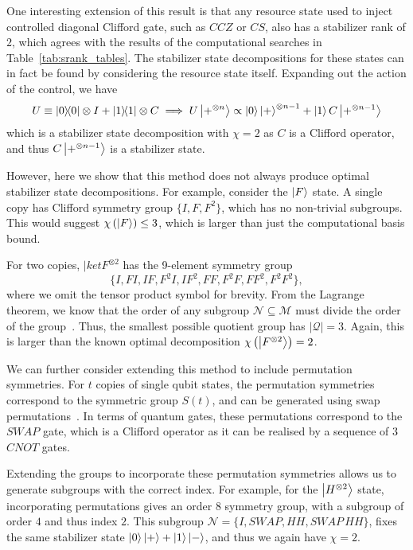One interesting extension of this result is that any resource state used to inject controlled diagonal Clifford gate, such as $CCZ$ or $CS$, also has a stabilizer rank of $2$, which agrees with the results of the computational searches in Table~\ref{tab:srank_tables}. The stabilizer state decompositions for these states can in fact be found by considering the resource state itself. Expanding out the action of the control, we have
\begin{equation}
U\equiv \ketbra{0}\otimes I+\ketbra{1}\otimes C \implies U\ket{+^{\otimes n}}\propto \ket{0}\ket{+}^{\otimes n-1}+\ket{1}C\ket{+^{\otimes n-1}}
\end{equation}
which is a stabilizer state decomposition with $\chi=2$ as $C$ is a Clifford operator, and thus $C\ket{+^{\otimes n-1}}$ is a stabilizer state.\par
However, here we show that this method does not always produce optimal stabilizer state decompositions. For example, consider the $\ket{F}$ state. A single copy has Clifford symmetry group $\{I, F, F^{2}\}$, which has no non-trivial subgroups. This would suggest $\chi\left(\ket{F}\right)\leq 3$, which is larger than just the computational basis bound.\par
For two copies, $|ket{F^{\otimes 2}}$ has the 9-element symmetry group
\begin{equation}
\{I,FI, IF, F^{2}I, IF^{2}, FF, F^{2}F, FF^{2}, F^{2}F^{2}\},
\label{eq:f2_symmetry_group}
\end{equation} where we omit the tensor product symbol for brevity. From the Lagrange theorem, we know that the order of any subgroup $\mathcal{N}\subseteq\mathcal{M}$ must divide the order of the group~\cite{Artin2010}. Thus, the smallest possible quotient group has $\left|\mathcal{Q}\right|=3$. Again, this is larger than the known optimal decomposition $\chi\left(\ket{F^{\otimes 2}}\right)=2$.\par
We can further consider extending this method to include permutation symmetries. For $t$ copies of single qubit states, the permutation symmetries correspond to the symmetric group $S(t)$, and can be generated using swap permutations~\cite{Artin2010}. In terms of quantum gates, these permutations correspond to the $SWAP$ gate, which is a Clifford operator as it can be realised by a sequence of $3$ $CNOT$ gates.\par
Extending the groups to incorporate these permutation symmetries allows us to generate subgroups with the correct index. For example, for the $\ket{H^{\otimes 2}}$ state, incorporating permutations gives an order $8$ symmetry group, with a subgroup of order $4$ and thus index $2$. This subgroup $\mathcal{N}=\{I, SWAP, HH, SWAP\,HH\}$, fixes the same stabilizer state $\ket{0}\ket{+}+\ket{1}\ket{-}$, and thus we again have $\chi=2$.\par
